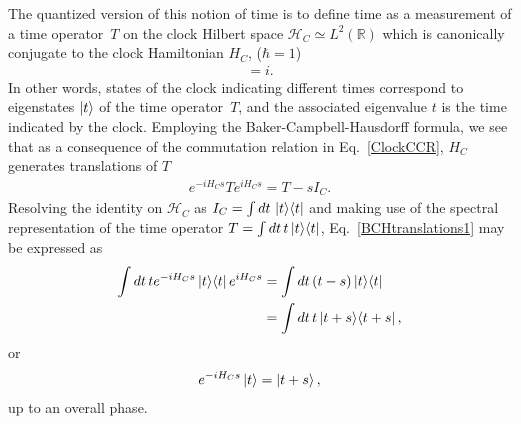 \documentclass[a4paper,twocolumn,superscriptaddress,11pt,accepted=2019-06-04]{quantumarticle}
\newcommand{\nn}{\nonumber}		%
\begin{document}
The quantized version of this notion of time is to define time as a measurement of a time operator~$T$ on the clock Hilbert space $\mathcal{H}_C \simeq L^2(\mathbb{R})$ which is canonically conjugate to the clock Hamiltonian $H_C$, ($\hbar=1$)
\begin{align}
[T, H_C] = i. \label{ClockCCR}
\end{align}
In other words, states of the clock indicating different times correspond to eigenstates $\ket{t}$ of the time operator~$T$, and the associated eigenvalue $t$ is the time indicated by the clock. Employing the Baker-Campbell-Hausdorff formula, we see that as a consequence of the commutation relation in Eq.~\eqref{ClockCCR}, $H_C$ generates translations of $T$
\begin{align}
e^{-iH_C s} T e^{iH_C s} = T - s I_C. \label{BCHtranslations1}
\end{align}
Resolving the identity on $\mathcal{H}_C$ as $I_C = \int dt \, \ket{t}\!\bra{t}$ and making use of the spectral representation of the time operator $T = \int dt \, t \ket{t}\!\bra{t}$, Eq.~\eqref{BCHtranslations1} may be expressed as
\begin{align}
\int dt \, t e^{-iH_C s}   \ket{t}\!\bra{t} e^{iH_C s} &= \int dt \, (t - s )\ket{t}\!\bra{t}\nn\\ &= \int dt \, t \ket{t+s}\!\bra{t+s}, \nn
\end{align}
or
\begin{align}
e^{-iH_C s} \ket{t} = \ket{t+s}, \label{ClockStates}
\end{align}
up to an overall phase.
\end{document}
